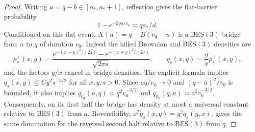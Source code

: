\documentclass[11pt,a4paper]{article}
\numberwithin{equation}{section}
\theoremstyle{remark}
\begin{document}
\begin{proof}
Writing $a=q-b\in[a_*,a_*+1]$, reflection gives the flat-barrier probability
\begin{equation}\label{eq:7.14}
1-e^{-2qa/v_0}\asymp qa_*/d.
\end{equation}
Conditioned on this flat event, $X(u)=q-B(v_0-u)$ is a BES$(3)$ bridge from $a$ to $q$ of duration $v_0$. Indeed the killed Brownian and BES$(3)$ densities are
\begin{equation}\label{eq:7.15}
p_s^+(x,y)=\frac{e^{-(x-y)^2/(2s)}-e^{-(x+y)^2/(2s)}}{\sqrt{2\pi s}},
\qquad q_s(x,y)=\frac yx p_s^+(x,y),
\end{equation}
and the factors $y/x$ cancel in bridge densities.
The explicit formula implies $q_s(x,y)\le Cy^2s^{-3/2}$ for all $x,y,s>0$.
Since $aq/v_0\to0$ and $(q-a)^2/v_0$ is bounded, it also implies
$q_{v_0}(a,q)\asymp q^2v_0^{-3/2}$ and
$q_{v_0}(q,a)\asymp a^2v_0^{-3/2}$.
Consequently, on its first half the bridge has density at most a universal constant relative to BES$(3)$ from $a$. Reversibility,
$x^2q_s(x,y)=y^2q_s(y,x)$, gives the same domination for the reversed second half relative to BES$(3)$ from $q$.


\end{proof}
\end{document}
